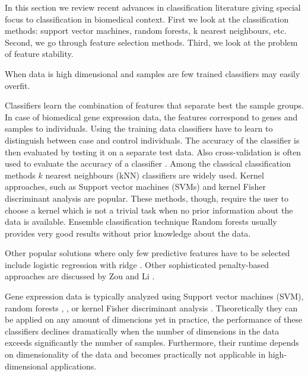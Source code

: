 \documentclass{llncs}
\begin{document}
In this section we review recent advances in classification literature giving
special focus to classification in biomedical context. First we look at the
classification methods: support vector machines, random forests, k nearest
neighbours, etc. Second, we go through feature selection methods. Third, we
look at the problem of feature stability.



When data is high dimensional and samples are few trained classifiers may easily overfit.

Classifiers learn the combination of features that separate best the sample groups. In case of biomedical gene expression data, the features correspond to genes and samples to individuals. Using the training data classifiers have to learn to distinguish between case and control individuals. The accuracy of the classifier is then evaluated by testing it on a separate test data. Also cross-validation is often used to evaluate the accuracy of a classifier \cite{XX}. Among the classical classification methods $k$ nearest neighbours (kNN)  \cite{XX} classifiers are widely used. Kernel approaches, such as Support vector machines (SVMs)\cite{cortes1995support} and kernel Fisher discriminant analysis are popular\cite{cho2004gene}. These methods, though, require the user to choose a kernel which is not a trivial task when no prior information about the data is available. Ensemble classification technique Random forests \cite{breiman2001random} usually provides very good results without prior knowledge about the data. 

Other popular solutions where only few predictive features have to be selected include logistic regression with ridge \cite{friedman2001elements}. Other sophisticated penalty-based approaches are discussed by Zou and Li \cite{zou2008one}.

Gene expression data is typically analyzed using Support vector machines (SVM)\cite{cortes1995support}, random forests \cite{breiman2001random}, , or kernel Fisher discriminant analysis \cite{cho2004gene}. Theoretically they can be applied on any amount of dimencions yet in practice, the performance of these classifiers declines dramatically when the number of dimensions in the data exceeds significantly the number of samples. Furthermore, their runtime depends on dimensionality of the data and becomes practically not applicable in high-dimensional applications.


\end{document}
